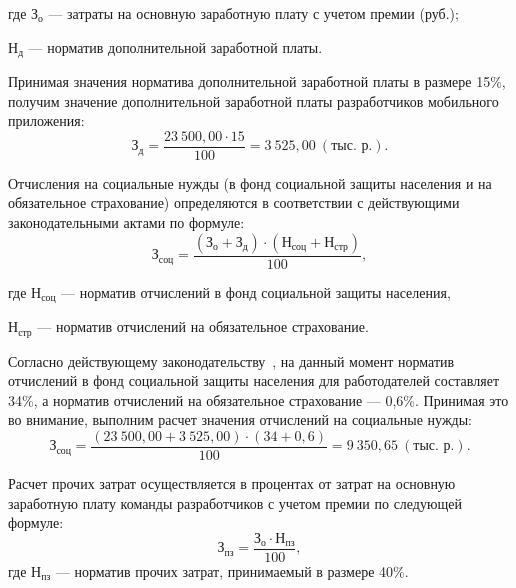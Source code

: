 \noindent где
\( \text{З}_{\text{о}} \)
--- затраты на основную заработную плату с учетом премии (руб.); \par
\noindent \hspace{6.5mm} \( \text{Н}_{\text{д}} \)
--- норматив дополнительной заработной платы.

Принимая значения норматива дополнительной заработной платы в размере 15\%,
получим значение дополнительной заработной платы разработчиков
мобильного приложения:
\begin{equation}
  \text{З}_{\text{д}} =
  \dfrac{23 \: 500{,}00 \cdot 15}{100} = 3 \: 525{,}00 \: (\text{тыс.~р.}).
\end{equation}

Отчисления на социальные нужды (в фонд социальной защиты
населения и на обязательное страхование) определяются в соответствии с
действующими законодательными актами по формуле:
\begin{equation}
  \text{З}_{\text{соц}} =
  \dfrac{(\text{З}_{\text{о}} + \text{З}_{\text{д}}) \cdot (\text{Н}_{\text{соц}} + \text{Н}_{\text{стр}})}{100},
\end{equation}

\noindent где
\( \text{Н}_{\text{соц}} \)
--- норматив отчислений в фонд социальной защиты населения, \par

\noindent \hspace{6.5mm} \( \text{Н}_{\text{стр}} \)
--- норматив отчислений на обязательное страхование.

Согласно действующему законодательству~\cite{law_social_royalties},
на данный момент норматив отчислений в фонд социальной защиты населения
для работодателей составляет 34\%, а норматив отчислений на обязательное
страхование --- 0{,}6\%. Принимая это во внимание, выполним расчет значения
отчислений на социальные нужды:
\begin{equation}
  \text{З}_{\text{соц}} =
  \dfrac{(23 \: 500{,}00 + 3 \: 525{,}00) \cdot (34 + 0{,}6)}{100} = 9 \: 350{,}65 \: (\text{тыс.~р.}).
\end{equation}

Расчет прочих затрат осуществляется в процентах от затрат на основную
заработную плату команды разработчиков с учетом премии по следующей формуле:
\begin{equation}
  \text{З}_{\text{пз}} =
  \dfrac{\text{З}_{\text{о}} \cdot \text{Н}_{\text{пз}}}{100},
\end{equation}
\noindent где
\( \text{Н}_{\text{пз}} \)
--- норматив прочих затрат, принимаемый в размере 40\%.


